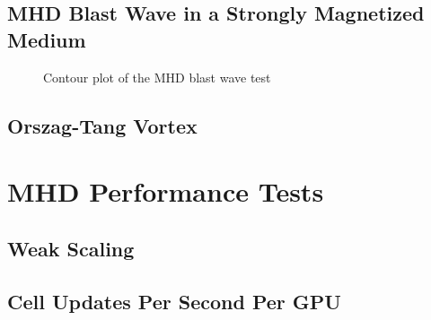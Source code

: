 



\subsection{MHD Blast Wave in a Strongly Magnetized Medium}
\label{sec:mhd-blast}

\begin{figure}[ht!]
    \caption{Contour plot of the MHD blast wave test }
    \label{fig:blast}
\end{figure}

\subsection{Orszag-Tang Vortex}
\label{sec:otv}

\section{MHD Performance Tests}
\label{sec:mhd-perf-tests}


\subsection{Weak Scaling}

\subsection{Cell Updates Per Second Per GPU}

